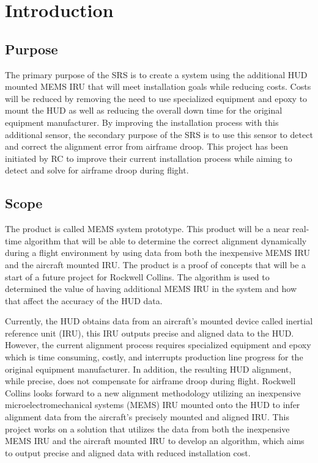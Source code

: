 

\section{Introduction}
\subsection{Purpose}
The primary purpose of the SRS is to create a system using the additional HUD mounted MEMS IRU that will meet installation goals while reducing costs. Costs will be reduced by removing the need to use specialized equipment and epoxy to mount the HUD as well as reducing the overall down time for the original equipment manufacturer. By improving the installation process with this additional sensor, the secondary purpose of the SRS is to use this sensor to detect and correct the alignment error from airframe droop. This project has been initiated by RC to improve their current installation process while aiming to detect and solve for airframe droop during flight.

\subsection{Scope}
The product is called MEMS system prototype. This product will be a near real-time algorithm that will be able to determine the correct alignment dynamically during a flight environment by using data from both the inexpensive MEMS IRU and the aircraft mounted IRU. The product is a proof of concepts that will be a start of a future project for Rockwell Collins. The algorithm is used to determined the value of having additional MEMS IRU in the system and how that affect the accuracy of the HUD data. 

Currently, the HUD obtains data from an aircraft’s mounted device called inertial reference unit (IRU), this IRU outputs precise and aligned data to the HUD. However, the current alignment process requires specialized equipment and epoxy which is time consuming, costly, and interrupts production line progress for the original equipment manufacturer. In addition, the resulting HUD alignment, while precise, does not compensate for airframe droop during flight. Rockwell Collins looks forward to a new alignment methodology utilizing an inexpensive microelectromechanical systems (MEMS) IRU mounted onto the HUD to infer alignment data from the aircraft’s precisely mounted and aligned IRU. This project works on a solution that utilizes the data from both the inexpensive MEMS IRU and the aircraft mounted IRU to develop an algorithm, which aims to output precise and aligned data with reduced installation cost. 

